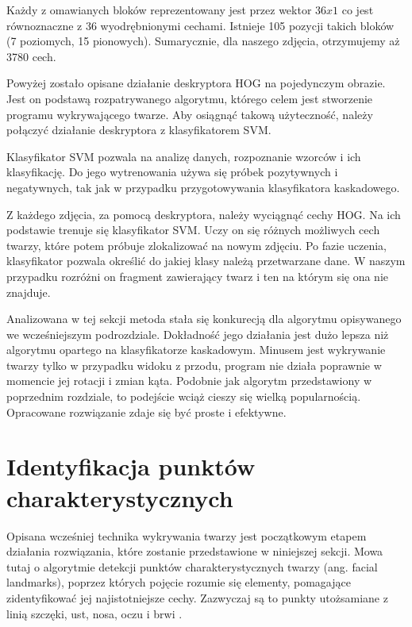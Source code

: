 Każdy z omawianych bloków reprezentowany jest przez wektor $36x1$ co jest równoznaczne z 36 wyodrębnionymi cechami. Istnieje 105 pozycji takich bloków (7 poziomych, 15 pionowych). Sumarycznie, dla naszego zdjęcia, otrzymujemy aż 3780 cech.

Powyżej zostało opisane działanie deskryptora HOG na pojedynczym obrazie. Jest on podstawą rozpatrywanego algorytmu, którego celem jest stworzenie programu wykrywającego twarze. Aby osiągnąć takową użyteczność, należy połączyć działanie deskryptora z klasyfikatorem SVM.

Klasyfikator SVM pozwala na analizę danych, rozpoznanie wzorców i ich klasyfikację. Do jego wytrenowania używa się próbek pozytywnych i negatywnych, tak jak w przypadku przygotowywania klasyfikatora kaskadowego.

Z każdego zdjęcia, za pomocą deskryptora, należy wyciągnąć cechy HOG. Na ich podstawie trenuje się klasyfikator SVM. Uczy on się różnych możliwych cech twarzy, które potem próbuje zlokalizować na nowym zdjęciu. Po fazie uczenia, klasyfikator pozwala określić do jakiej klasy należą przetwarzane dane. W naszym przypadku rozróżni on fragment zawierający twarz i ten na którym się ona nie znajduje. 

Analizowana w tej sekcji metoda stała się konkurecją dla algorytmu opisywanego we wcześniejszym podrozdziale. Dokładność jego działania jest dużo lepsza niż algorytmu opartego na klasyfikatorze kaskadowym. Minusem jest wykrywanie twarzy tylko w przypadku widoku z przodu, program nie działa poprawnie w momencie jej rotacji i zmian kąta. Podobnie jak algorytm przedstawiony w poprzednim rozdziale, to podejście wciąż cieszy się wielką popularnością. Opracowane rozwiązanie zdaje się być proste i efektywne.


\section{Identyfikacja punktów charakterystycznych}
\label{sec:landmarks}
Opisana wcześniej technika wykrywania twarzy jest początkowym etapem działania rozwiązania, które zostanie przedstawione w niniejszej sekcji. Mowa tutaj o algorytmie detekcji punktów charakterystycznych twarzy (ang. facial landmarks), poprzez których pojęcie rozumie się elementy, pomagające zidentyfikować jej najistotniejsze cechy. Zazwyczaj są to punkty utożsamiane z linią szczęki, ust, nosa, oczu i brwi \cite{landmarks2}.

